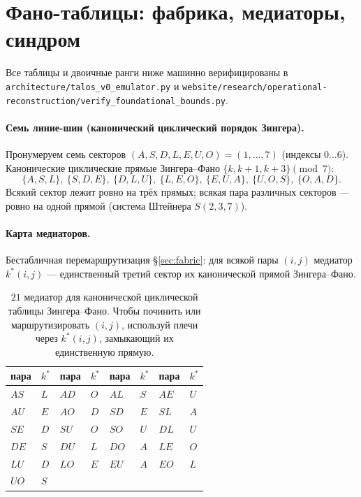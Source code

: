 \section{Фано-таблицы: фабрика, медиаторы, синдром}
\label{app:fano}

\begin{sloppypar}
Все таблицы и двоичные ранги ниже машинно верифицированы в
\texttt{architecture/talos\_v0\_emulator.py} и
\texttt{website/research/operational-reconstruction/verify\_foundational\_bounds.py}.
\end{sloppypar}

\paragraph{Семь линие-шин (канонический циклический порядок Зингера).}
Пронумеруем семь секторов $(A,S,D,L,E,U,O)=(1,\dots,7)$ (индексы $0\dots 6$).
Канонические циклические прямые Зингера--Фано $\{k,k{+}1,k{+}3\}\pmod 7$:
\[
\{A,S,L\},\ \{S,D,E\},\ \{D,L,U\},\ \{L,E,O\},\ \{E,U,A\},\ \{U,O,S\},\ \{O,A,D\}.
\]
Всякий сектор лежит ровно на трёх прямых; всякая пара различных секторов ---
ровно на одной прямой (система Штейнера $S(2,3,7)$).

\paragraph{Карта медиаторов.} Бестабличная перемаршрутизация \S\ref{sec:fabric}:
для всякой пары $(i,j)$ медиатор $k^\ast(i,j)$ --- единственный третий сектор их
канонической прямой Зингера--Фано.

\begin{table}[H]
\centering\small
\begin{tabular}{@{}llll llll@{}}
\toprule
пара & $k^\ast$ & пара & $k^\ast$ & пара & $k^\ast$ & пара & $k^\ast$ \\
\midrule
$AS$ & $L$ & $AD$ & $O$ & $AL$ & $S$ & $AE$ & $U$ \\
$AU$ & $E$ & $AO$ & $D$ & $SD$ & $E$ & $SL$ & $A$ \\
$SE$ & $D$ & $SU$ & $O$ & $SO$ & $U$ & $DL$ & $U$ \\
$DE$ & $S$ & $DU$ & $L$ & $DO$ & $A$ & $LE$ & $O$ \\
$LU$ & $D$ & $LO$ & $E$ & $EU$ & $A$ & $EO$ & $L$ \\
$UO$ & $S$ &      &     &      &     &      &     \\
\bottomrule
\end{tabular}
\caption{$21$ медиатор для канонической циклической таблицы Зингера--Фано. Чтобы
починить или маршрутизировать $(i,j)$, используй плечи через $k^\ast(i,j)$,
замыкающий их единственную прямую.}
\end{table}

